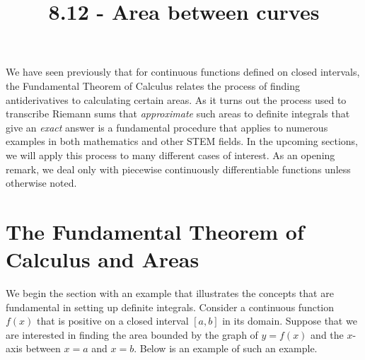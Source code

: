 \documentclass{ximera}
\title{8.12 - Area between curves}
\begin{document}
\begin{abstract}
\end{abstract}
\maketitle

We have seen previously that for continuous functions defined on closed intervals, the Fundamental Theorem of Calculus relates the process of finding antiderivatives to calculating certain areas.  As it turns out the process used to transcribe Riemann sums that \emph{approximate} such areas to definite integrals that give an \emph{exact} answer is a fundamental procedure that applies to numerous examples in both mathematics and other STEM fields.  In the upcoming sections, we will apply this process to many different cases of interest.  As an opening remark, we deal only with piecewise continuously differentiable functions unless otherwise noted.  

\section{The Fundamental Theorem of Calculus and Areas}

We begin the section with an example that illustrates the concepts that are fundamental in setting up definite integrals.  Consider a continuous function $f(x)$ that is positive on a closed interval $[a,b]$ in its domain.   Suppose that we are interested in finding the area bounded by the graph of $y=f(x)$ and the $x$-axis between $x=a$ and $x=b$.  Below is an example of such an example.


\begin{image}
\end{image}
\end{document}
